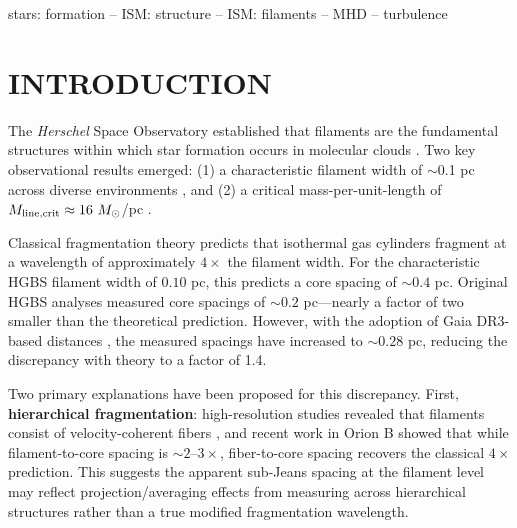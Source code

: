 \documentclass[twocolumn]{mnras}
\begin{document}
\begin{abstract}
\textbf{Field geometry crisis}. Perpendicular-field simulations predict $\lambda/W \approx 1.25$ (or $\approx 2.02$ after width normalisation), below both nearest-neighbour observations ($\approx 2.0$--$2.2$) and pairwise median ($\approx 2.8$). Since $\sim$90\% of filaments are perpendicular to the mean field (Planck 2016), this creates an independent theoretical crisis: the dominant filament population should produce shorter spacings than observed.

\textbf{Implications}. Resolving whether filaments fragment at the classical $4\times$ scale requires: (1) proper nearest-neighbour analysis with HGBS skeleton data; (2) field geometry measurements at fragmentation scales; (3) observational constraints on radial confinement; (4) bridging the extrapolation gap ($f \approx 1.2$--$1.5$).
\end{abstract}

\begin{keywords}
stars: formation -- ISM: structure -- ISM: filaments -- MHD -- turbulence
\end{keywords}


\section{INTRODUCTION}

The \textit{Herschel} Space Observatory established that filaments are the fundamental structures within which star formation occurs in molecular clouds \citep{Andre2010}. Two key observational results emerged: (1) a characteristic filament width of $\sim$0.1 pc across diverse environments \citep{Arzoumanian2011}, and (2) a critical mass-per-unit-length of $M_{\rm line,crit} \approx 16~M_\odot$/pc \citep{Ostriker1964}.

Classical fragmentation theory \citep{Inutsuka1992} predicts that isothermal gas cylinders fragment at a wavelength of approximately $4\times$ the filament width. For the characteristic HGBS filament width of $0.10$ pc, this predicts a core spacing of $\sim0.4$ pc. Original HGBS analyses measured core spacings of $\sim0.2$ pc—nearly a factor of two smaller than the theoretical prediction. However, with the adoption of Gaia DR3-based distances \citep{Zhang2023}, the measured spacings have increased to $\sim0.28$ pc, reducing the discrepancy with theory to a factor of 1.4.

Two primary explanations have been proposed for this discrepancy. First, \textbf{hierarchical fragmentation}: high-resolution studies revealed that filaments consist of velocity-coherent fibers \citep{Hacar2013}, and recent work in Orion B \citep{Yang2024} showed that while filament-to-core spacing is $\sim2$--$3\times$, fiber-to-core spacing recovers the classical $4\times$ prediction. This suggests the apparent sub-Jeans spacing at the filament level may reflect projection/averaging effects from measuring across hierarchical structures rather than a true modified fragmentation wavelength.
\end{document}
